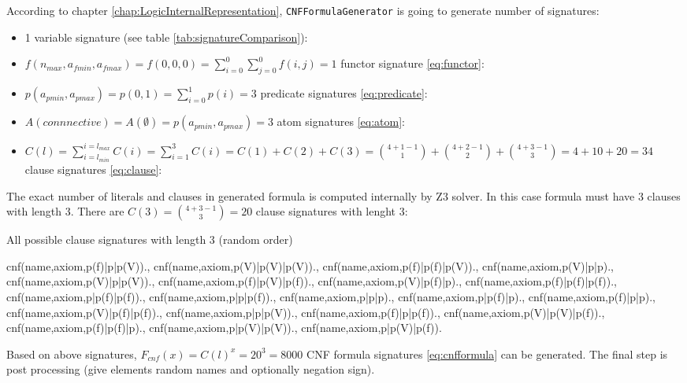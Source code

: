 According to chapter \ref{chap:LogicInternalRepresentation}, \texttt{CNFFormulaGenerator} is going to generate number of signatures:
\begin{itemize}
  \item 1 variable signature (see table \ref{tab:signatureComparison}): \tptpcodeinline{[V]}
  \item $f(n_{max}, a_{fmin}, a_{fmax}) = f(0, 0, 0) = \sum_{i=0}^{0} \sum_{j=0}^0 f(i, j) = 1$ functor signature \ref{eq:functor}: \tptpcodeinline{[f]}
  \item $p(a_{pmin}, a_{pmax}) = p(0, 1) = \sum_{i=0}^1 p(i) = 3$ predicate signatures \ref{eq:predicate}: \tptpcodeinline{[p, p(V), p(f)]}
  \item $A(connnective) = A(\emptyset) = p(a_{pmin}, a_{pmax}) = 3$ atom signatures \ref{eq:atom}: \tptpcodeinline{[p(V), p(f), p]}
  \item $C(l) = \sum_{i=l_{min}}^{i=l_{max}} C(i) = \sum_{i=1}^{3} C(i) = C(1) + C(2) + C(3) = \binom{4 + 1 -1}{1} + \binom{4 + 2 - 1}{2} + \binom{4 + 3 - 1}{3} = 4 + 10 + 20 = 34$ clause signatures \ref{eq:clause}:
\end{itemize}

The exact number of literals and clauses in generated formula is computed internally by Z3 solver. In this case formula must have 3 clauses with length 3.
There are $C(3) = \binom{4 + 3 - 1}{3} = 20$ clause signatures with lenght 3:

\begin{listing}[H]
  \caption{All possible clause signatures with length 3 (random order)}
\begin{tptpcode}
{cnf(name,axiom,p(f)|p|p(V))., cnf(name,axiom,p(V)|p(V)|p(V)).,
 cnf(name,axiom,p(f)|p(f)|p(V))., cnf(name,axiom,p(V)|p|p).,
 cnf(name,axiom,p(V)|p|p(V))., cnf(name,axiom,p(f)|p(V)|p(f)).,
 cnf(name,axiom,p(V)|p(f)|p)., cnf(name,axiom,p(f)|p(f)|p(f)).,
 cnf(name,axiom,p|p(f)|p(f))., cnf(name,axiom,p|p|p(f)).,
 cnf(name,axiom,p|p|p)., cnf(name,axiom,p|p(f)|p).,
 cnf(name,axiom,p(f)|p|p)., cnf(name,axiom,p(V)|p(f)|p(f)).,
 cnf(name,axiom,p|p|p(V))., cnf(name,axiom,p(f)|p|p(f)).,
 cnf(name,axiom,p(V)|p(V)|p(f))., cnf(name,axiom,p(f)|p(f)|p).,
 cnf(name,axiom,p|p(V)|p(V))., cnf(name,axiom,p|p(V)|p(f)).}
\end{tptpcode}
\end{listing}

Based on above signatures, $F_{cnf}(x) = C(l)^x = 20^3 = 8000$ \gls{CNF} formula signatures \ref{eq:cnfformula} can be generated. The final step is post processing (give elements random names and optionally negation sign).

